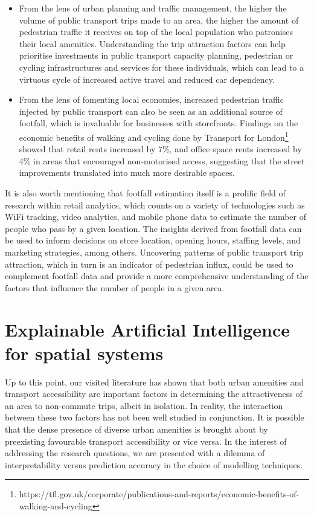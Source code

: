 \begin{itemize}
    \setlength\itemsep{0em}
    \item From the lens of urban planning and traffic management, the higher the volume of public transport trips made to an area, the higher the amount of pedestrian traffic it receives on top of the local population who patronises their local amenities. Understanding the trip attraction factors can help prioritise investments in public transport capacity planning, pedestrian or cycling infrastructures and services for these individuals, which can lead to a virtuous cycle of increased active travel and reduced car dependency.
    \item From the lens of fomenting local economies, increased pedestrian traffic injected by public transport can also be seen as an additional source of footfall, which is invaluable for businesses with storefronts. Findings on the economic benefits of walking and cycling done by Transport for London\footnote{https://tfl.gov.uk/corporate/publications-and-reports/economic-benefits-of-walking-and-cycling} showed that retail rents increased by 7\%, and office space rents increased by 4\% in areas that encouraged non-motorised access, suggesting that the street improvements translated into much more desirable spaces.
\end{itemize}

It is also worth mentioning that footfall estimation itself is a prolific field of research within retail analytics, which counts on a variety of technologies such as WiFi tracking, video analytics, and mobile phone data to estimate the number of people who pass by a given location. The insights derived from footfall data can be used to inform decisions on store location, opening hours, staffing levels, and marketing strategies, among others. Uncovering patterns of public transport trip attraction, which in turn is an indicator of pedestrian influx, could be used to complement footfall data and provide a more comprehensive understanding of the factors that influence the number of people in a given area.

\section{Explainable Artificial Intelligence for spatial systems}

Up to this point, our visited literature has shown that both urban amenities and transport accessibility are important factors in determining the attractiveness of an area to non-commute trips, albeit in isolation. In reality, the interaction between these two factors has not been well studied in conjunction. It is possible that the dense presence of diverse urban amenities is brought about by preexisting favourable transport accessibility or vice versa. In the interest of addressing the research questions, we are presented with a dilemma of interpretability versus prediction accuracy in the choice of modelling techniques.

